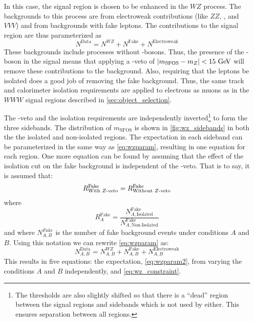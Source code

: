 In this case, the signal region is chosen to be enhanced in the $WZ$ process.
The backgrounds to this process are from electroweak contributions (like
$ZZ$, \ttV, and $VVV$) and from backgrounds with fake leptons.
The contributions to the signal region are thus parameterized as
\begin{equation}
\label{eq:wzparam}
N^{\textrm{Data}} =  N^{WZ} + N^{\textrm{Fake}} + N^{\textrm{Electroweak}}
\end{equation}
These backgrounds include processes without \z-bosons.
Thus, the presence of the \z-boson in the signal means that applying a \z-veto of 
$|m_{\textrm{SFOS}}-m_{\z}|<15\GeV$
will remove these contributions to the background.
Also, requiring that the leptons be isolated does a good job of 
removing the fake background.
Thus, the same track and calorimeter isolation requirements
are applied to electrons as muons as in the $WWW$ signal regions
described in \sec\ref{sec:object_selection}.

The \z-veto and the isolation requirements are 
independently inverted\footnote{The thresholds are also slightly shifted 
so that there is a ``dead'' region between the signal regions and sidebands 
which is not used by either. This ensures separation between all regions.}
to form the three sidebands.
The distribution of $m_{\textrm{SFOS}}$ is shown in
\fig\ref{fig:wz_sidebands} in both the the isolated and non-isolated regions.
The expectation in each sideband can be parameterized
in the same way as \eqn\eqref{eq:wzparam}, resulting in one
equation for each region.
One more equation can be found by assuming that the effect of 
the isolation cut on the fake background is independent of the \z-veto.
That is to say, it is assumed that:
\begin{equation}
\label{eq:wz_constraint}
R^{\textrm{Fake}}_{\textrm{With \ensuremath{Z}-veto}} = R^{\textrm{Fake}}_{\textrm{Without \ensuremath{Z}-veto}}
\end{equation}
where 
\begin{equation}
R^{\textrm{Fake}}_{A} = 
\frac{N^{\textrm{Fake}}_{A,\textrm{Isolated}}}
{N^{\textrm{Fake}}_{A,\textrm{Non-Isolated}}}
\end{equation}
and where $N^{Fake}_{A,B}$ is the number of fake background
events under conditions $A$ and $B$.
Using this notation we can rewrite \eqn\eqref{eq:wzparam} as:
\begin{equation}
\label{eq:wzparam2}
N^{\textrm{Data}}_{A,B} =  N^{WZ}_{A,B} + N^{\textrm{Fake}}_{A,B} + N^{\textrm{Electroweak}}_{A,B}
\end{equation}
This results in five equations: the expectation,
\eqn\eqref{eq:wzparam2}, from varying the conditions $A$ and $B$ independently,
and \eqn\eqref{eq:wz_constraint}.



